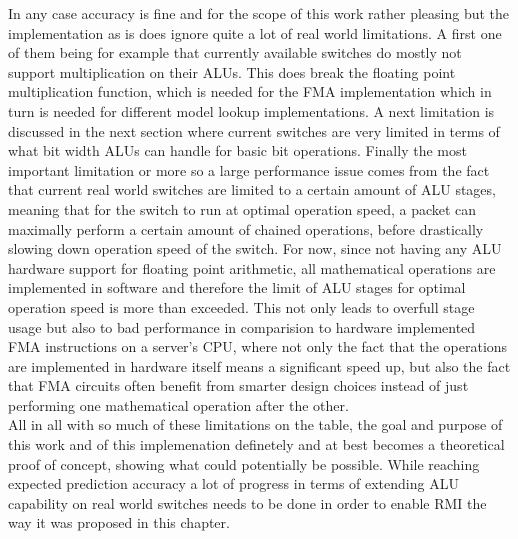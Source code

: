 In any case accuracy is fine and for the scope of this work rather pleasing but the implementation as is does ignore quite a lot of real world limitations. A first one of them being for example that currently available switches do mostly not support multiplication on their ALUs. This does break the floating point multiplication function, which is needed for the FMA implementation which in turn is needed for different model lookup implementations. A next limitation is discussed in the next section where current switches are very limited in terms of what bit width ALUs can handle for basic bit operations. Finally the most important limitation or more so a large performance issue comes from the fact that current real world switches are limited to a certain amount of ALU stages, meaning that for the switch to run at optimal operation speed, a packet can maximally perform a certain amount of chained operations, before drastically slowing down operation speed of the switch. For now, since not having any ALU hardware support for floating point arithmetic, all mathematical operations are implemented in software and therefore the limit of ALU stages for optimal operation speed is more than exceeded. This not only leads to overfull stage usage but also to bad performance in comparision to hardware implemented FMA instructions on a server's CPU, where not only the fact that the operations are implemented in hardware itself means a significant speed up, but also the fact that FMA circuits often benefit from smarter design choices instead of just performing one mathematical operation after the other.\\

All in all with so much of these limitations on the table, the goal and purpose of this work and of this implemenation definetely and at best becomes a theoretical proof of concept, showing what could potentially be possible. While reaching expected prediction accuracy a lot of progress in terms of extending ALU capability on real world switches needs to be done in order to enable RMI the way it was proposed in this chapter.

